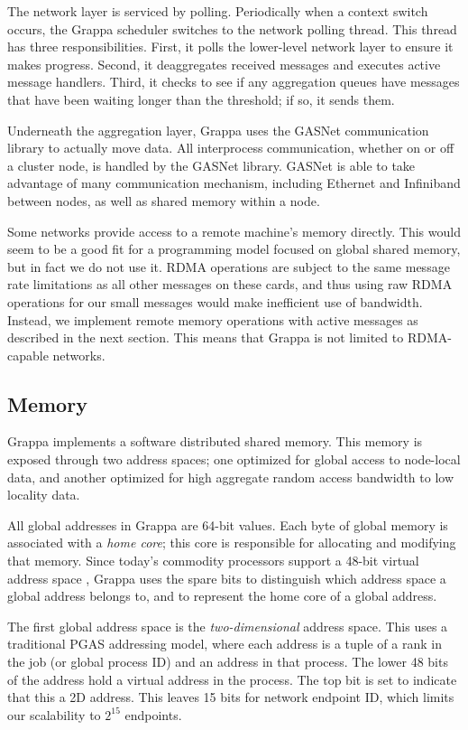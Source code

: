 The network layer is serviced by polling. Periodically when a context
switch occurs, the Grappa scheduler switches to the network polling
thread. This thread has three responsibilities. First, it polls the
lower-level network layer to ensure it makes progress. Second, it
deaggregates received messages and executes active message
handlers. Third, it checks to see if any aggregation queues have
messages that have been waiting longer than the threshold; if so, it
sends them.

Underneath the aggregation layer, Grappa uses the GASNet communication
library  to actually move data. All interprocess
communication, whether on or off a cluster node, is handled by the
GASNet library. GASNet is able to take advantage of many communication
mechanism, including Ethernet and Infiniband between nodes, as well as
shared memory within a node.

Some networks provide access to a remote machine's memory
directly. This would seem to be a good fit for a programming model
focused on global shared memory, but in fact we do not use it. RDMA
operations are subject to the same message rate limitations as all
other messages on these cards, and thus using raw RDMA operations for
our small messages would make inefficient use of bandwidth. Instead,
we implement remote memory operations with active messages as
described in the next section. This means that Grappa is not limited
to RDMA-capable networks.

\subsection{Memory}

Grappa implements a software distributed shared memory. This memory is
exposed through two address spaces; one optimized for global access to
node-local data, and another optimized for high aggregate random
access bandwidth to low locality data.

All global addresses in Grappa are 64-bit values. Each byte of global
memory is associated with a {\em home core}; this core is responsible
for allocating and modifying that memory. Since today's commodity
processors support a 48-bit virtual address space , Grappa
uses the spare bits to distinguish which address space a global
address belongs to, and to represent the home core of a global
address.

The first global address space is the {\em two-dimensional} address
space. This uses a traditional PGAS addressing model, where each
address is a tuple of a rank in the job (or global process ID) and an
address in that process. The lower 48 bits of the address hold a
virtual address in the process. The top bit is set to indicate that
this a 2D address. This leaves 15 bits for network endpoint ID, which
limits our scalability to $2^15$ endpoints.

